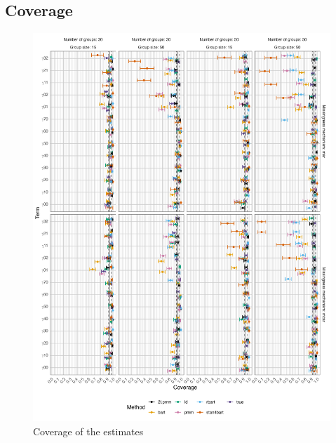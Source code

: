 \documentclass[10pt, a4paper, titlepage]{article}
\begin{document}
\subsection{Coverage}
\begin{figure}[H]
    \centering
    \includegraphics[width=1\textwidth]{coverage.png}
    \caption{Coverage of the estimates}
    \label{fig:coverage}
\end{figure}
\end{document}
